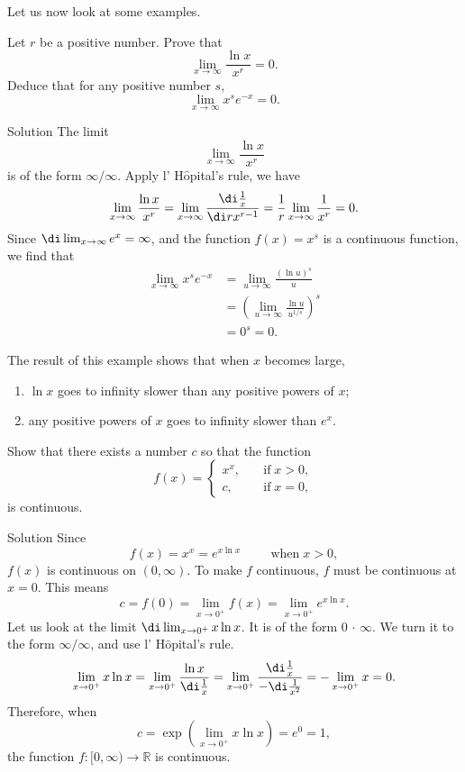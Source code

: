 \begin{example}{}
Let us now look at some examples.
\begin{example}[label=230307_11]{}
Let $r$ be a positive number.
Prove that
\[\lim_{x\to \infty}\frac{\ln x}{x^{r}}=0.\]
Deduce that for any positive number $s$,
\[\lim_{x\to \infty}x^se^{-x}=0.\]
\end{example}
\begin{solution}{Solution}
The limit \[\lim_{x\to \infty}\frac{\ln x}{x^{r}}\] is of the form $\infty/\infty$. Apply l' H$\hat{\text{o}}$pital's rule, we have
\[\lim_{x\to \infty}\frac{\ln x}{x^{r}}=\lim_{x\to\infty}\frac{\di \frac{1}{x}}{\di rx^{r-1}}=\frac{1}{r}\lim_{x\to \infty}\frac{1}{x^r}=0.\]  Since $\di\lim_{x\to \infty}e^x=\infty$, and the function $f(x)=x^s$ is a continuous function, we find that
\begin{align*}
\lim_{x\to\infty}x^se^{-x}&=\lim_{u\to \infty} \frac{(\ln u)^s}{u}\\
&=\left(\lim_{u\to \infty} \frac{\ln u}{u^{1/s}}\right)^s\\
&=0^s=0.
\end{align*}
\end{solution}
\begin{highlight}{}
The result of this example shows that when $x$ becomes large,\begin{enumerate}[$\bullet$\;\;]
\item $\ln x$ goes to infinity slower than any positive powers of $x$;
\item any positive powers of $x$ goes to infinity slower than $e^x$.\end{enumerate}
\end{highlight}

\begin{example}{}
Show that there exists a number $c$  so that the function
\[f(x)=\begin{cases} x^x,\quad &\text{if}\;x>0,\\
c,\quad &\text{if}\;x=0,\end{cases}\] is continuous.
\end{example}\begin{solution}{Solution}
Since
\[f(x)=x^x=e^{x\ln x}\hspace{1cm}\text{when}\;x>0,\] $f(x)$ is continuous on $(0, \infty)$.  To make $f$ continuous, $f$ must be continuous at $x=0$. This means
\[c=f(0)=\lim_{x\to 0^+}f(x)=\lim_{x\to 0^+}e^{x\ln x}.\]
Let us look at the limit $\di\lim_{x\to 0^+}x\ln x$. It is of the form $0\,\cdot\,\infty$. We turn it to the form $\infty/\infty$, and use l' H$\hat{\text{o}}$pital's rule.  
\[\lim_{x\to 0^+}x\ln x=\lim_{x\to 0^+}\frac{\ln x}{\di\frac{1}{x}}=\lim_{x\to 0^+}\frac{\di \frac{1}{x}}{-\di\frac{1}{x^2}}=-\lim_{x\to 0^+}x=0.\]Therefore, when
\[c=\exp\left(\lim_{x\to 0^+}x\ln x\right)=e^0=1,\]the function $f:[0, \infty)\to\mathbb{R}$ is continuous.
\end{solution}


\end{example}

